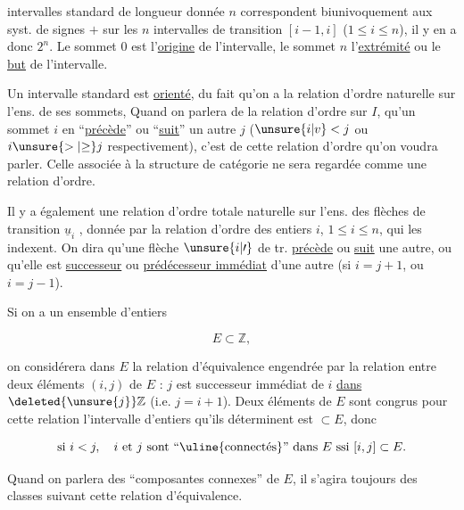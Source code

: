

intervalles standard de longueur donnée $n$ correspondent biunivoquement aux syst. de signes \deleted{\unsure{$\pm$}} $+$  sur les $n$ intervalles de transition $[i-1,i]$ ($1\leq i\leq n$), il y en a donc $2^n$. Le sommet $0$ est l'\uline{origine}  de l'intervalle, le sommet $n$ l'\uline{extrémité} ou le \uline{but} de l'intervalle.

Un intervalle standard est \uline{orienté}, du fait qu'on a la relation d'ordre  naturelle sur l'ens. de ses sommets,  Quand on parlera de la relation d'ordre sur $I$, qu'un sommet $i$ en ``\uline{précède}'' ou ``\uline{suit}'' un autre $j$ ($\unsure{i|v}<j$ ou $i\unsure{>|{\geq}}j$ respectivement), c'est de cette relation d'ordre qu'on voudra parler. Celle associée à la structure de catégorie ne sera  regardée comme une relation d'ordre.

Il y a également une relation d'ordre totale naturelle sur l'ens. des flèches de transition $\underline{u}_i$ , donnée par  la relation d'ordre des entiers $i$, $1\leq i\leq n$, qui les indexent. On dira qu'une flèche $\unsure{i|\prime}$ de tr. \uline{précède} ou \uline{suit} une autre, ou  qu'elle est \uline{successeur}  ou \uline{prédécesseur immédiat} d'une autre (si $i=j+1$, ou $i=j-1$).

Si on a un ensemble d'entiers

\[E\subset\mathbb{Z},\]

on  considérera dans $E$ la relation d'équivalence engendrée par la relation entre deux éléments $(i,j)$ de $E$ : $j$ est successeur immédiat de $i$ \uline{dans} $\deleted{\unsure{j}}\mathbb{Z}$ (i.e. $j=i+1$). Deux éléments  de $E$  sont congrus pour cette relation   l'intervalle d'entiers qu'ils déterminent est $\subset E$, donc

\[\text{si }i<j,\quad i\text{ et }j\text{ sont ``\uline{connectés}'' dans }E\text{ ssi }[i,j]\subset E.\]



Quand on parlera des ``composantes connexes'' de $E$, il s'agira toujours des classes suivant cette relation d'équivalence.

